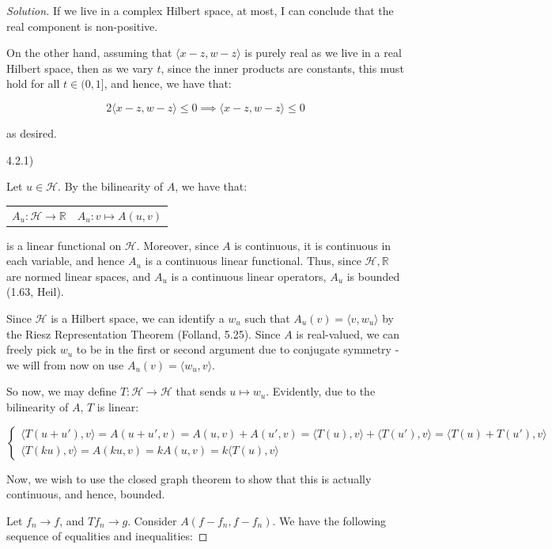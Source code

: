 \documentclass[10pt]{article}
\begin{document}
\begin{proof}[Solution]
If we live in a complex Hilbert space, at most, I can conclude that the real component is non-positive.

On the other hand, assuming that $\langle x - z, w - z \rangle$ is purely real as we live in a real Hilbert space, then as we vary $t$, since the inner products are constants, this must hold for all $t \in (0,1]$, and hence, we have that:

$$ 2 \langle x - z, w - z \rangle \leq 0 \implies \langle x - z, w - z \rangle \leq 0 $$

as desired.

4.2.1)

Let $u  \in \mathcal{H}$. By the bilinearity of $A$, we have that:
\begin{center}
\begin{tabular}{c c} $A_u : \mathcal{H} \to \mathbb{R}$ & $A_u: v \mapsto A(u,v) $\end{tabular}
\end{center}

is a linear functional on $\mathcal{H}$. Moreover, since $A$ is continuous, it is continuous in each variable, and hence $A_u$ is a continuous linear functional. Thus, since $\mathcal{H}, \mathbb{R}$ are normed linear spaces, and $A_u$ is a continuous linear operators, $A_u$ is bounded (1.63, Heil).

Since $\mathcal{H}$ is a Hilbert space, we can identify a $w_u$ such that $A_u(v) = \langle v, w_u \rangle$ by the Riesz Representation Theorem (Folland, 5.25). Since $A$ is real-valued, we can freely pick $w_u$ to be in the first or second argument due to conjugate symmetry - we will from now on use $A_u(v) = \langle w_u, v\rangle$.

So now, we may define $T: \mathcal{H} \to \mathcal{H}$ that sends $u \mapsto w_u$. Evidently, due to the bilinearity of $A$, $T$ is linear:

$$\begin{cases} \langle T(u + u'), v \rangle = A(u + u', v) = A(u, v) + A(u', v) = \langle T(u), v \rangle + \langle T(u'), v \rangle = \langle T(u) + T(u'), v \rangle \\ \langle T(ku), v \rangle =A(ku, v) = k A(u, v) = k \langle T(u), v \rangle \end{cases} $$ 

Now, we wish to use the closed graph theorem to show that this is actually continuous, and hence, bounded.

Let $f_n \to f$, and $Tf_n \to g$. Consider $A(f - f_n, f - f_n)$. We have the following sequence of equalities and inequalities: 


\end{proof}
\end{document}
